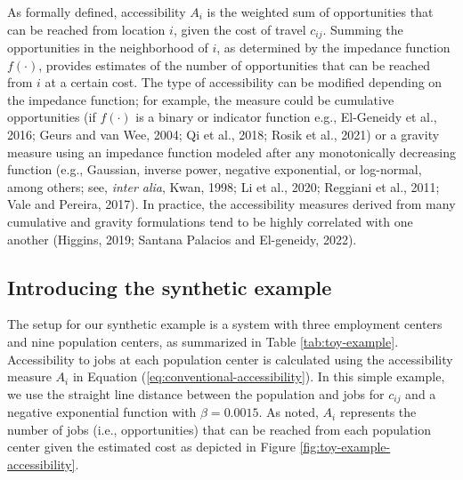 \documentclass[]{elsarticle} %
\begin{document}
As formally defined, accessibility \(A_i\) is the weighted sum of
opportunities that can be reached from location \(i\), given the cost of
travel \(c_{ij}\). Summing the opportunities in the neighborhood of
\(i\), as determined by the impedance function \(f(\cdot)\), provides
estimates of the number of opportunities that can be reached from \(i\)
at a certain cost. The type of accessibility can be modified depending
on the impedance function; for example, the measure could be cumulative
opportunities (if \(f(\cdot)\) is a binary or indicator function e.g.,
El-Geneidy et al., 2016; Geurs and van Wee, 2004; Qi et al., 2018; Rosik
et al., 2021) or a gravity measure using an impedance function modeled
after any monotonically decreasing function (e.g., Gaussian, inverse
power, negative exponential, or log-normal, among others; see,
\emph{inter alia}, Kwan, 1998; Li et al., 2020; Reggiani et al., 2011;
Vale and Pereira, 2017). In practice, the accessibility measures derived
from many cumulative and gravity formulations tend to be highly
correlated with one another (Higgins, 2019; Santana Palacios and
El-geneidy, 2022).

\hypertarget{accessibility-numerical-example}{%
\subsection{Introducing the synthetic
example}\label{accessibility-numerical-example}}

The setup for our synthetic example is a system with three employment
centers and nine population centers, as summarized in Table
\ref{tab:toy-example}. Accessibility to jobs at each population center
is calculated using the accessibility measure \(A_i\) in Equation
(\ref{eq:conventional-accessibility}). In this simple example, we use
the straight line distance between the population and jobs for
\(c_{ij}\) and a negative exponential function with \(\beta = 0.0015\).
As noted, \(A_i\) represents the number of jobs (i.e., opportunities)
that can be reached from each population center given the estimated cost
as depicted in Figure \ref{fig:toy-example-accessibility}.
\end{document}
